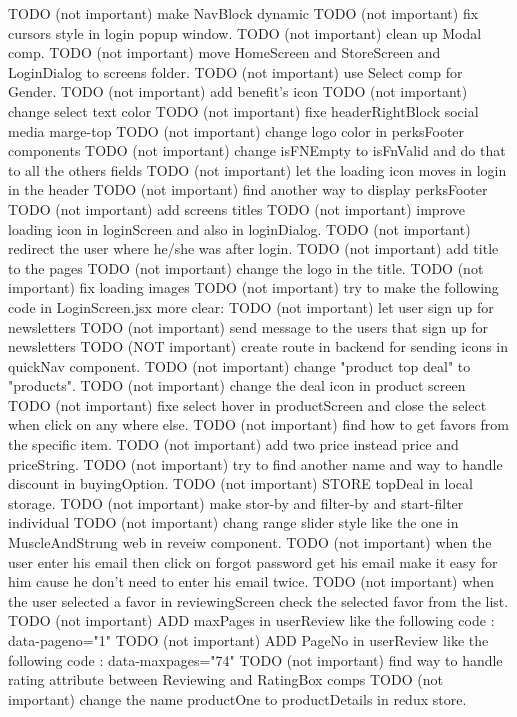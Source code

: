TODO (not important) make NavBlock dynamic  
TODO (not important) fix cursors style in login popup window.
TODO (not important) clean up Modal comp.
TODO (not important) move HomeScreen and StoreScreen and LoginDialog to screens folder.
TODO (not important) use Select comp for Gender.
TODO (not important) add benefit's icon
TODO (not important) change select text color
TODO (not important) fixe headerRightBlock social media marge-top 
TODO (not important) change logo color in perksFooter  components
TODO (not important) change isFNEmpty to isFnValid and do that to all the others fields
TODO (not important) let the loading icon moves in login in the header
TODO (not important)  find another way to display perksFooter
TODO (not important) add screens titles
TODO (not important) improve loading icon in loginScreen and also in loginDialog.
TODO (not important) redirect the user where he/she was after login.
TODO (not important) add title to the pages 
TODO (not important) change the logo in the title.
TODO (not important) fix loading images
TODO (not important) try to make the following code in LoginScreen.jsx more clear:
TODO (not important) let user sign up for newsletters 
TODO (not important) send message to the users that sign up for newsletters
TODO (NOT important) create route in backend for sending icons in quickNav component.
TODO (not important) change "product top deal" to "products".
TODO (not important) change the deal icon in product screen
TODO (not important) fixe select hover in productScreen and close the select when click on any where else.
TODO (not important) find how to get favors from the specific item.
TODO (not important) add two price instead price and priceString. 
TODO (not important) try to find another name and way to handle discount in buyingOption.
TODO (not important) STORE  topDeal in local storage.
TODO (not important) make stor-by and filter-by and start-filter individual
TODO (not important) chang range slider style like the one in MuscleAndStrung web in reveiw component.
TODO (not important) when the user enter his email then click on forgot password get his email make it easy for him cause he don't need to enter his email twice.
TODO (not important) when the user selected a favor in reviewingScreen check the selected favor from the list.
TODO (not important) ADD maxPages in userReview like the following code : data-pageno="1"
TODO (not important) ADD PageNo in userReview like the following code : data-maxpages="74"
TODO (not important) find way to handle rating attribute between Reviewing and RatingBox comps 
TODO (not important) change the name productOne to productDetails in redux store.
